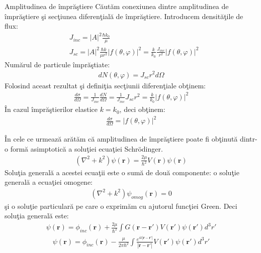 \begin{frame}[allowframebreaks]{Amplitudinea de \^{i}mpr\u{a}\c{s}tiere}
C\u{a}ut\u{a}m conexiunea dintre amplitudinea de \^{i}mpr\u{a}\c{s}tiere \c{s}i sec\c{t}iunea diferen\c{t}ial\u{a} de \^{i}mpr\u{a}\c{s}tiere.
Introducem densit\u{a}\c{t}ile de flux: 
\begin{align}
&J_{inc}=|A|^2 \frac{\hbar k_0}{\mu}\\
&J_{sc}=|A|^2 \frac{\hbar k}{\mu r^2}|f(\theta,\varphi)|^2=\frac{k}{k_0}\frac{J_{inc}}{r^2}|f(\theta,\varphi)|^2
\end{align}
Num\u{a}rul de particule \^{i}mpr\u{a}\c{s}tiate:
\begin{align}
dN(\theta,\varphi)=J_{sc}r^2d\Omega
\end{align}
Folosind aceast rezultat \c{s}i defini\c{t}ia sec\c{t}iunii diferen\c{t}iale ob\c{t}inem:
\begin{align}
\frac{d\sigma}{d\Omega}=\frac{1}{J_{inc}}\frac{dN}{d\Omega}=\frac{1}{J_{inc}}J_{sc}r^2=\frac{k}{k_0}|f(\theta,\varphi)|^2
\end{align}
\^{I}n cazul \^{i}mpr\u{a}\c{s}tierilor elastice $k=k_0$, deci ob\c{t}inem:
\begin{align}
\frac{d\sigma}{d\Omega}=|f(\theta,\varphi)|^2
\end{align}

\newpage

\^{I}n cele ce urmeaz\u{a} ar\u{a}t\u{a}m c\u{a} amplitudinea de \^{i}mpr\u{a}\c{s}tiere poate fi ob\c{t}inut\u{a} dintr-o form\u{a} asimptotic\u{a} a solu\c{t}iei ecua\c{t}iei Schr\"{o}dinger.
\begin{align}
(\nabla^2+k^2)\psi({\bm r})=\frac{2\mu}{\hbar^2}V({\bm r})\psi({\bm r}) 
\end{align}
Solu\c{t}ia general\u{a} a acestei ecua\c{t}ii este o sum\u{a} de dou\u{a} componente: o solu\c{t}ie general\u{a} a ecua\c{t}iei omogene:
\begin{align}
(\nabla^2+k^2)\psi_{omog}({\bm r})=0
\end{align}
\c{s}i o solu\c{t}ie particular\u{a} pe care o exprim\u{a}m cu ajutorul func\c{t}iei Green. Deci solu\c{t}ia general\u{a} este:
\begin{align}
\psi({\bm r})=\phi_{inc}({\bm r})+\frac{2\mu}{\hbar^2}\int G({\bm r}-{\bm r'})V({\bm r'})\psi({\bm r'})d^3r' \label{ecuatie236}
\end{align} 
\begin{align}
\psi({\bm r})=\phi_{inc}({\bm r})-\frac{\mu}{2\pi\hbar^2}\int\frac{e^{ik|{\bm r}-{\bm r'}|}}{|{\bm r}-{\bm r'}|}V({\bm r'})\psi({\bm r'})d^3r' \label{ecuatie247}
\end{align}
\newpage


\end{frame}
